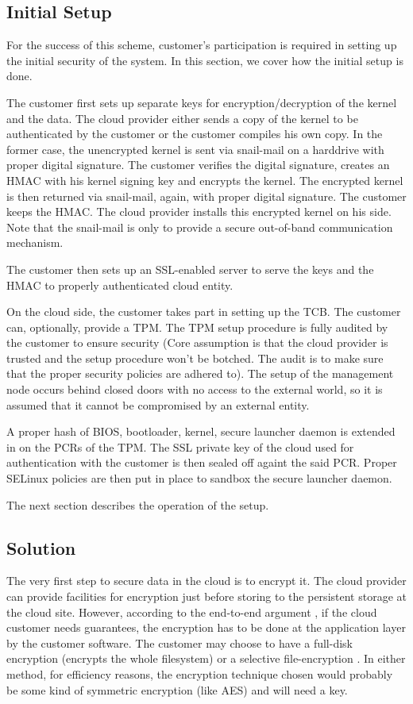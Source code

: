 \documentclass[10pt,twocolumn,pdftex]{article}
\begin{document}
\subsection{Initial Setup}
For the success of this scheme, customer's participation is required in setting up the initial security of the system. In this section, we cover how the initial setup is done.

The customer first sets up separate keys for encryption/decryption of the kernel and the data. The cloud provider either sends a copy of the kernel to be authenticated by the customer or the customer compiles his own copy. In the former case, the unencrypted kernel is sent via snail-mail on a harddrive with proper digital signature. The customer verifies the digital signature, creates an HMAC with his kernel signing key and encrypts the kernel. The encrypted kernel is then returned via snail-mail, again, with proper digital signature. The customer keeps the HMAC. The cloud provider installs this encrypted kernel on his side. Note that the snail-mail is only to provide a secure out-of-band communication mechanism.

The customer then sets up an SSL-enabled server to serve the keys and the HMAC to properly authenticated cloud entity. 

On the cloud side, the customer takes part in setting up the TCB. The customer can, optionally, provide a TPM. The TPM setup procedure is fully audited by the customer to ensure security (Core assumption is that the cloud provider is trusted and the setup procedure won't be botched. The audit is to make sure that the proper security policies are adhered to). The setup of the management node occurs behind closed doors with no access to the external world, so it is assumed that it cannot be compromised by an external entity.

A proper hash of {BIOS, bootloader, kernel, secure launcher daemon} is extended in on the PCRs of the TPM. The SSL private key of the cloud used for authentication with the customer is then sealed off againt the said PCR. Proper SELinux policies are then put in place to sandbox the secure launcher daemon.

The next section describes the operation of the setup.

\subsection{Solution}
The very first step to secure data in the cloud is to encrypt it. The cloud provider can provide facilities for encryption just before storing to the persistent storage at the cloud site. However, according to the end-to-end argument \cite{end-to-end}, if the cloud customer needs guarantees, the encryption has to be done at the application layer by the customer software. The customer may choose to have a full-disk encryption (encrypts the whole filesystem) \cite{disk-encryption, truecrypt} or a selective file-encryption \cite{nss}. In either method, for efficiency reasons, the encryption technique chosen would probably be some kind of symmetric encryption (like AES) and will need a key. 
\end{document}
